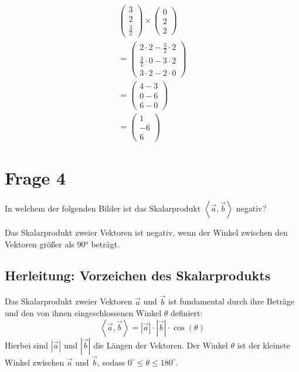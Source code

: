 \begin{align*}
    \begin{pmatrix}
        3 \\ 2 \\ \frac{3}{2}
    \end{pmatrix} \times \begin{pmatrix}
                             0 \\ 2 \\2
                         \end{pmatrix}                                                          \\
    = \begin{pmatrix}
          2 \cdot 2 - \frac{3}{2} \cdot 2 \\ \frac{3}{2} \cdot 0 - 3 \cdot 2 \\ 3 \cdot 2 - 2 \cdot 0
      \end{pmatrix} \\
    = \begin{pmatrix}
          4 - 3 \\ 0 - 6 \\ 6 - 0
      \end{pmatrix}                                                                     \\
    = \begin{pmatrix}
          1 \\ -6 \\ 6
      \end{pmatrix}
\end{align*}

\section{Frage 4}
In welchem der folgenden Bilder ist das Skalarprodukt $\left\langle \vec{a},
    \vec{b} \right\rangle$ negativ?

Das Skalarprodukt zweier Vektoren ist negativ, wenn der Winkel zwischen den
Vektoren größer als 90° beträgt.

\subsection*{Herleitung: Vorzeichen des Skalarprodukts}
Das Skalarprodukt zweier Vektoren $\vec{a}$ und $\vec{b}$ ist fundamental durch
ihre Beträge und den von ihnen eingeschlossenen Winkel $\theta$ definiert: $$
    \left\langle \vec{a}, \vec{b} \right\rangle = |\vec{a}| \cdot |\vec{b}| \cdot
    \cos(\theta) $$ Hierbei sind $|\vec{a}|$ und $|\vec{b}|$ die Längen der
Vektoren. Der Winkel $\theta$ ist der kleinste Winkel zwischen $\vec{a}$ und
$\vec{b}$, sodass $0^\circ \le \theta \le 180^\circ$.

